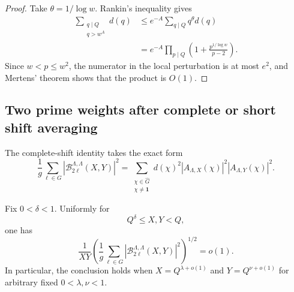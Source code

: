 \begin{proof}
Take $\theta=1/\log w$.  Rankin's inequality gives
\begin{align*}
 \sum_{\substack{q\mid Q\\q>w^A}}d(q)
 &\le e^{-A}\sum_{q\mid Q}q^\theta d(q)\\
 &=e^{-A}\prod_{p\mid Q}
    \left(1+\frac{p^{1/\log w}}{p-2}\right).
\end{align*}
Since $w<p\le w^2$, the numerator in the local perturbation is at most
$e^2$, and Mertens' theorem shows that the product is $O(1)$.
\end{proof}

\subsection{Two prime weights after complete or short shift averaging}
\label{subsec:lambda-shift-means}

The complete-shift identity takes the exact form
\begin{equation}
 \frac1g\sum_{\ell\in G}
  |\mathcal B_{2\ell}^{\Lambda,\Lambda}(X,Y)|^2
 =\sum_{\substack{\chi\in\widehat G\\\chi\ne\mathbf1}}
 d(\chi)^2
 |A_{\Lambda,X}(\chi)|^2|A_{\Lambda,Y}(\chi)|^2.
 \label{eq:lambda-complete-shift-parseval}
\end{equation}

\begin{theorem}
\label{thm:lambda-complete-shift-rms}
Fix $0<\delta<1$.  Uniformly for
\begin{equation}
 Q^\delta\le X,Y<Q,
 \label{eq:lambda-all-power-range}
\end{equation}
one has
\begin{equation}
 \frac1{XY}
 \left(
  \frac1g\sum_{\ell\in G}
  |\mathcal B_{2\ell}^{\Lambda,\Lambda}(X,Y)|^2
 \right)^{1/2}=o(1).
 \label{eq:lambda-complete-shift-rms}
\end{equation}
In particular, the conclusion holds when
$X=Q^{\lambda+o(1)}$ and $Y=Q^{\nu+o(1)}$ for arbitrary fixed
$0<\lambda,\nu<1$.
\end{theorem}

